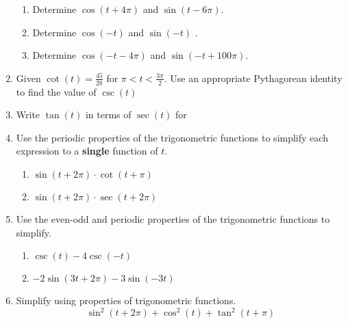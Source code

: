 \begin{enumerate}
\begin{enumerate}
\item Determine $\cos(t+4\pi)$ and $\sin(t-6\pi)$. \\[1in]

\item Determine $\cos(-t)$ and $\sin(-t)$ . \\[1in]

\item Determine $\cos(-t-4\pi)$ and $\sin(-t+100\pi)$. \\[1in]
\end{enumerate}


\newpage

\item Given $\cot(t)=\frac{45}{28}$ for $\pi<t<\frac{3\pi}{2}$.  Use an appropriate Pythagorean identity to find the value of $\csc(t)$

\vfill
\item Write $\tan(t)$ in terms of $\sec(t)$ for
\begin{enumerate}
\end{enumerate}

\vfill

\newpage

\item Use the periodic properties of the trigonometric functions to simplify each expression to a \textbf{single} function of $t$.

\begin{enumerate} 
\item $\sin(t+2\pi)\cdot \cot(t+\pi)$\vfill
\item  $\sin(t+2\pi)\cdot \sec(t+2\pi)$\vfill
\end{enumerate}



\item Use the even-odd and periodic properties of the trigonometric functions to simplify.
\begin{enumerate}
\item $\csc(t)-4\csc(-t)$\vfill
\item $-2\sin(3t+2\pi)-3\sin(-3t)$\vfill
\end{enumerate}

\vfill


\item Simplify using properties of trigonometric functions. $$\sin^2(t+2\pi)+\cos^2(t)+\tan^2(t+\pi)$$
\vfill


\end{enumerate}
